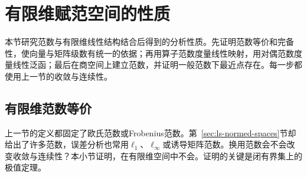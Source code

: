 \section{有限维赋范空间的性质}
\label{sec:ls-finite-dimensional-normed-properties}

本节研究范数与有限维线性结构结合后得到的分析性质。先证明范数等价和完备性，使向量与矩阵级数有统一的依据；再用算子范数度量线性映射，用对偶范数度量线性泛函；最后在商空间上建立范数，并证明一般范数下最近点存在。每一步都使用上一节的收敛与连续性。

\subsection{有限维范数等价}
\label{sec:multivariable-norm-equivalence}
\label{sec:linear-algebra-sequence-convergence}

上一节的定义都固定了欧氏范数或Frobenius范数。第~\ref{sec:ls-normed-spaces}节却给出了许多范数，误差分析也常用$\ell_1$、$\ell_\infty$或诱导矩阵范数。换用范数会不会改变收敛与连续性？本小节证明，在有限维空间中不会。证明的关键是闭有界集上的极值定理。

